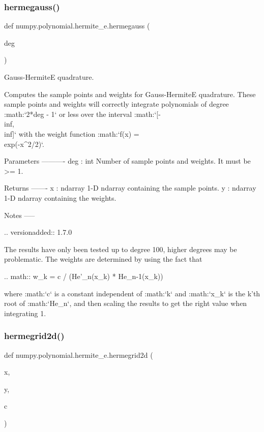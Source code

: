 \subsubsection{\texorpdfstring{hermegauss()}{hermegauss()}}
{\footnotesize\ttfamily def numpy.\+polynomial.\+hermite\+\_\+e.\+hermegauss (\begin{DoxyParamCaption}\item[{}]{deg }\end{DoxyParamCaption})}

\begin{DoxyVerb}Gauss-HermiteE quadrature.

Computes the sample points and weights for Gauss-HermiteE quadrature.
These sample points and weights will correctly integrate polynomials of
degree :math:`2*deg - 1` or less over the interval :math:`[-\\inf, \\inf]`
with the weight function :math:`f(x) = \\exp(-x^2/2)`.

Parameters
----------
deg : int
    Number of sample points and weights. It must be >= 1.

Returns
-------
x : ndarray
    1-D ndarray containing the sample points.
y : ndarray
    1-D ndarray containing the weights.

Notes
-----

.. versionadded:: 1.7.0

The results have only been tested up to degree 100, higher degrees may
be problematic. The weights are determined by using the fact that

.. math:: w_k = c / (He'_n(x_k) * He_{n-1}(x_k))

where :math:`c` is a constant independent of :math:`k` and :math:`x_k`
is the k'th root of :math:`He_n`, and then scaling the results to get
the right value when integrating 1.\end{DoxyVerb}
 \mbox{\label{namespacenumpy_1_1polynomial_1_1hermite__e_a13d5e2334d3c12f9221c2772c6200a15}} 
\subsubsection{\texorpdfstring{hermegrid2d()}{hermegrid2d()}}
{\footnotesize\ttfamily def numpy.\+polynomial.\+hermite\+\_\+e.\+hermegrid2d (\begin{DoxyParamCaption}\item[{}]{x,  }\item[{}]{y,  }\item[{}]{c }\end{DoxyParamCaption})}

